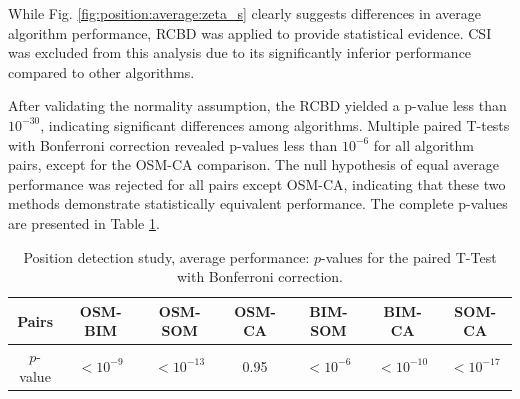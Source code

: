 \documentclass{IEEEtran}
\begin{document}

                While Fig. \ref{fig:position:average:zeta_s} clearly suggests differences in average algorithm performance, RCBD was applied to provide statistical evidence. CSI was excluded from this analysis due to its significantly inferior performance compared to other algorithms. 

                After validating the normality assumption, the RCBD yielded a p-value less than $10^{-30}$, indicating significant differences among algorithms. Multiple paired T-tests with Bonferroni correction revealed p-values less than $10^{-6}$ for all algorithm pairs, except for the OSM-CA comparison. The null hypothesis of equal average performance was rejected for all pairs except OSM-CA, indicating that these two methods demonstrate statistically equivalent performance. The complete p-values are presented in Table \ref{tab:position:average:pvalue}.

                \begin{table}
                    \centering
                    \renewcommand{\arraystretch}{1.5}
                    \caption{Position detection study, average performance: $p$-values for the paired T-Test with Bonferroni correction.}
                    \label{tab:position:average:pvalue}
                    \begin{tabular}{ccccccc}
                        Pairs & OSM-BIM & OSM-SOM & OSM-CA & BIM-SOM & BIM-CA & SOM-CA \\\hline
                        $p$-value & $<10^{-9}$ & $<10^{-13}$ & 0.95 & $<10^{-6}$ & $<10^{-10}$ & $<10^{-17}$ \\  
                    \end{tabular}
                \end{table}
\end{document}
